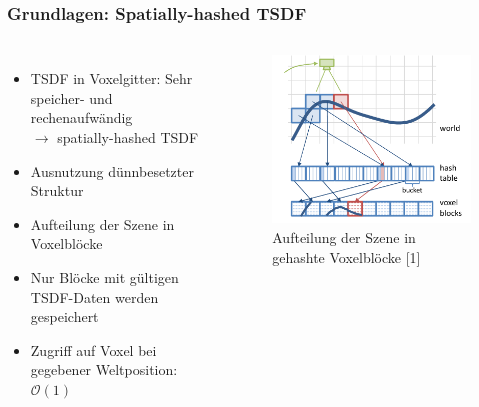     \begin{frame}[t]
    \frametitle{Grundlagen: Spatially-hashed TSDF}

    \begin{columns}[t]
      \column[]{7cm}
      
      \begin{itemize}
       \item TSDF in Voxelgitter: Sehr speicher- und rechenaufwändig \\ $\rightarrow$ spatially-hashed TSDF
       \item Ausnutzung dünnbesetzter Struktur
       \item Aufteilung der Szene in Voxelblöcke%
       \item Nur Blöcke mit gültigen TSDF-Daten werden gespeichert
       \item Zugriff auf Voxel bei gegebener Weltposition: $\mathcal O(1)$
      \end{itemize}
     

      \column{5cm}
      
       \begin{figure}[h]
 	\centering
 	    \includegraphics[width=\textwidth]{images/voxel_hashing.pdf}
 	\caption{Aufteilung der Szene in gehashte Voxelblöcke [1]} 
       \end{figure}
  
    \end{columns}
    \end{frame}